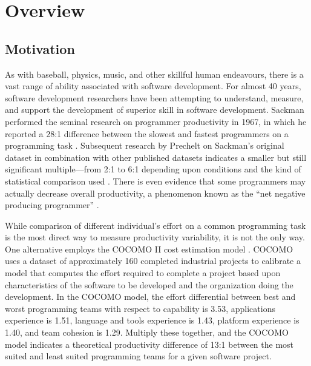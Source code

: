 
\section{Overview}

\subsection{Motivation}
As with baseball, physics, music, and other skillful human endeavours, there
is a vast range of ability associated with software development.  For
almost 40 years, software development researchers have been attempting to
understand, measure, and support the development of superior skill in
software development.  Sackman performed the seminal research on programmer
productivity in 1967, in which he reported a 28:1 difference between the
slowest and fastest programmers on a programming task \cite{Sackman68}.
Subsequent research by Prechelt on Sackman's original dataset in
combination with other published datasets indicates a smaller but still
significant multiple---from 2:1 to 6:1 depending upon conditions and the
kind of statistical comparison used \cite{Prechelt99}.  There is even 
evidence that some programmers may actually decrease overall productivity, 
a phenomenon known as the ``net negative producing programmer'' \cite{Schulmeyer92}.

While comparison of different individual's effort on a common programming task is the
most direct way to measure productivity variability, it is not the only way.
One alternative  employs the COCOMO II cost estimation model
\cite{Boehm00}. COCOMO uses a dataset of approximately 160 completed
industrial projects to calibrate a model that computes the effort required
to complete a project based upon characteristics of the software to be
developed and the organization doing the development.  In the COCOMO model, the
effort differential between best and worst programming teams with respect
to capability is 3.53, applications experience is 1.51, language and tools
experience is 1.43, platform experience is 1.40, and team cohesion is 1.29.
Multiply these together, and the COCOMO model indicates a theoretical
productivity difference of 13:1 between the most suited and least suited
programming teams for a given software project. 

